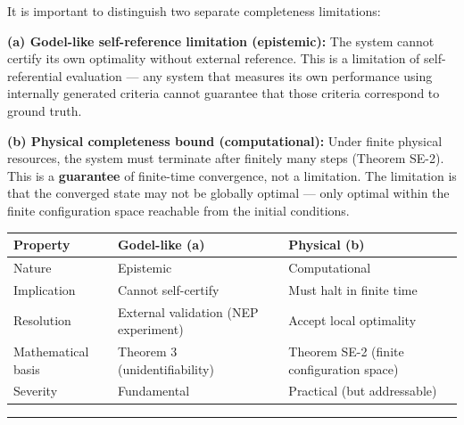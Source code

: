 \documentclass[
  12pt,
]{ctexart}
\begin{document}
It is important to distinguish two separate completeness limitations:

\textbf{(a) Godel-like self-reference limitation (epistemic):} The
system cannot certify its own optimality without external reference.
This is a limitation of self-referential evaluation --- any system that
measures its own performance using internally generated criteria cannot
guarantee that those criteria correspond to ground truth.

\textbf{(b) Physical completeness bound (computational):} Under finite
physical resources, the system must terminate after finitely many steps
(Theorem SE-2). This is a \textbf{guarantee} of finite-time convergence,
not a limitation. The limitation is that the converged state may not be
globally optimal --- only optimal within the finite configuration space
reachable from the initial conditions.

\begin{longtable}[]{@{}
  >{\raggedright\arraybackslash}p{}
  >{\raggedright\arraybackslash}p{}
  >{\raggedright\arraybackslash}p{}@{}}
\toprule\noalign{}
\begin{minipage}[b]{\linewidth}\raggedright
Property
\end{minipage} & \begin{minipage}[b]{\linewidth}\raggedright
Godel-like (a)
\end{minipage} & \begin{minipage}[b]{\linewidth}\raggedright
Physical (b)
\end{minipage} \\
\midrule\noalign{}
\endhead
\bottomrule\noalign{}
\endlastfoot
Nature & Epistemic & Computational \\
Implication & Cannot self-certify & Must halt in finite time \\
Resolution & External validation (NEP experiment) & Accept local
optimality \\
Mathematical basis & Theorem 3 (unidentifiability) & Theorem SE-2
(finite configuration space) \\
Severity & Fundamental & Practical (but addressable) \\
\end{longtable}

\begin{center}\rule{0.5\linewidth}{0.5pt}\end{center}
\end{document}

